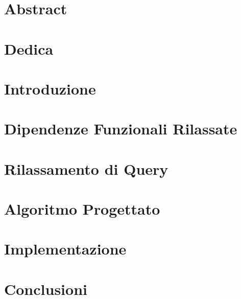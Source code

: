 \documentclass[12pt,oneside]{report}
\begin{document}

\clearpage
\setcounter{page}{1}
\chapter*{Abstract}


\tableofcontents
\listoftables
\chapter*{Dedica}

\chapter{Introduzione}


\chapter{Dipendenze Funzionali Rilassate}


\chapter{Rilassamento di Query}


\chapter{Algoritmo Progettato}


\chapter{Implementazione}


\chapter{Conclusioni}


\renewcommand\listoflistingscaption{Elenco degli snippet di codice}
\listoflistings


\end{document}
